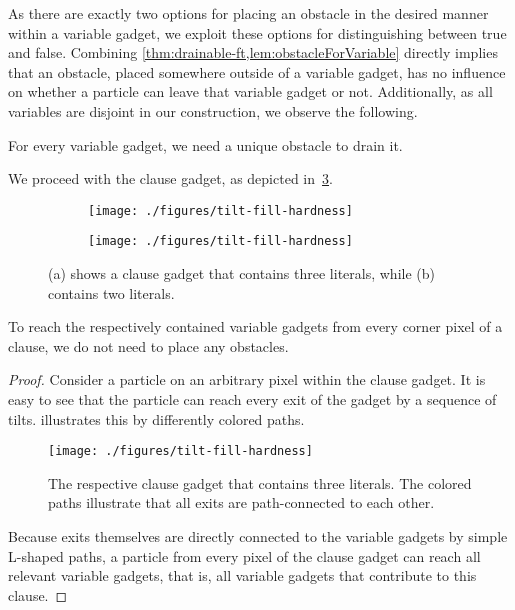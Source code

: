 \documentclass[a4paper,UKenglish,cleveref,thm-restate]{lipics-v2021}
\begin{document}
As there are exactly two options for placing an obstacle in the desired manner within a variable gadget, we exploit these options for distinguishing between true and false.
Combining \cref{thm:drainable-ft,lem:obstacleForVariable} directly implies that an obstacle, placed somewhere outside of a variable gadget, has no influence on whether a particle can leave that variable gadget or not.
Additionally, as all variables are disjoint in our construction, we observe the following.

\begin{corollary}
	\label{lem:variablesDisjoint}
	For every variable gadget, we need a unique obstacle to drain it.
\end{corollary}

We proceed with the clause gadget, as depicted in~\cref{fig:hardness-clauses}.

\begin{figure}[htb]
	\captionsetup[subfigure]{justification=centering}
	\begin{subfigure}[b]{.5\columnwidth}\centering
		\texttt{[image: ./figures/tilt-fill-hardness]}
		\caption{}
		\label{fig:hardness-clauses_a}
	\end{subfigure}\begin{subfigure}[b]{.5\columnwidth}
		\centering
		\texttt{[image: ./figures/tilt-fill-hardness]}
		\caption{}
		\label{fig:hardness-clauses_b}
	\end{subfigure}\caption{(a) shows a clause gadget that contains three literals, while (b) contains two literals.}
	\label{fig:hardness-clauses}
\end{figure}

\begin{lemma}
	\label{lem:clauseCorner}
	To reach the respectively contained variable gadgets from every corner pixel of a clause, we do not need to place any obstacles.
\end{lemma}

\begin{proof}
	Consider a particle on an arbitrary pixel within the clause gadget.
	It is easy to see that the particle can reach every exit of the gadget by a sequence of tilts.
	 illustrates this by differently colored paths.
	
	\begin{figure}[ht]
		\centering
		\texttt{[image: ./figures/tilt-fill-hardness]}
		\caption{The respective clause gadget that contains three literals. The colored paths illustrate that all exits are path-connected to each other.}
		\label{fig:allpositionsClause}
	\end{figure}
	
	Because exits themselves are directly connected to the variable gadgets by simple L-shaped paths, a particle from every pixel of the clause gadget can reach all relevant variable gadgets, that is, all variable gadgets that contribute to this clause.
\end{proof}
\end{document}
